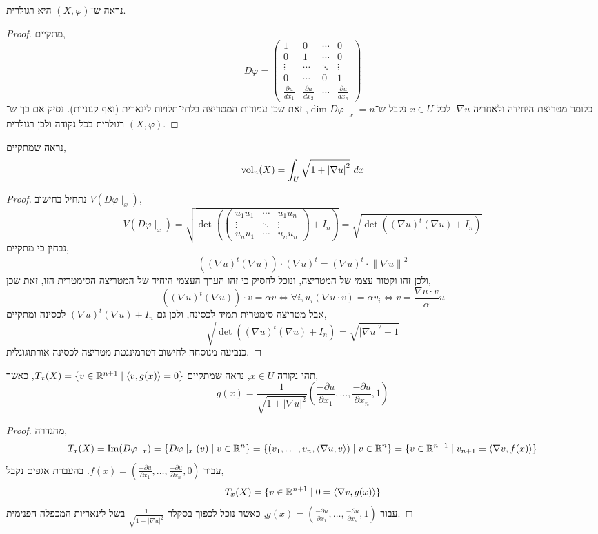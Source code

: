 \subquestion{}
נראה ש־$(X, \varphi)$ היא רגולרית.
\begin{proof}
	מתקיים,
	\[
		D\varphi
		= \begin{pmatrix}
			1 & 0 & \cdots & 0 \\
			0 & 1 & \cdots & 0 \\
			\vdots & \cdots & \ddots & \vdots \\
			0 & \cdots & 0 & 1 \\
			\frac{\partial u}{d x_1} & \frac{\partial u}{d x_2} & \cdots & \frac{\partial u}{d x_n}
		\end{pmatrix}
	\]
	כלומר מטריצת היחידה ולאחריה $\nabla u$.
	לכל $x \in U$ נקבל ש־$\dim D\varphi \mid_x = n$, זאת שכן עמודות המטריצה בלתי־תלויות לינארית (ואף קנוניות).
	נסיק אם כך ש־$(X, \varphi)$ רגולרית בכל נקודה ולכן רגולרית.
\end{proof}

\subquestion{}
נראה שמתקיים,
\[
	\operatorname{vol}_n(X)
	= \int_U \sqrt{1 + {|\nabla u|}^2}\ dx
\]
\begin{proof}
	נתחיל בחישוב $V(D\varphi \mid_x)$,
	\[
		V(D \varphi \mid_x)
		= \sqrt{\det\left(\begin{pmatrix}
				u_1 u_1 & \cdots & u_1 u_n \\
				\vdots & \ddots & \vdots \\
				u_n u_1 & \cdots & u_n u_n
		\end{pmatrix} + I_n\right)}
		= \sqrt{\det\left({(\nabla u)}^t (\nabla u) + I_n\right)}
	\]
	נבחין כי מתקיים,
	\[
		({(\nabla u)}^t (\nabla u)) \cdot {(\nabla u)}^t
		= {(\nabla u)}^t \cdot {\lVert \nabla u \rVert}^2
	\]
	ולכן זהו וקטור עצמי של המטריצה, ונוכל להסיק כי זהו הערך העצמי היחיד של המטריצה הסימטרית הזו, זאת שכן,
	\[
		({(\nabla u)}^t (\nabla u)) \cdot v = \alpha v
		\iff \forall i, 
		u_i (\nabla u \cdot v) = \alpha v_i
		\iff v = \frac{\nabla u \cdot v}{\alpha} u
	\]
	אבל מטריצה סימטרית תמיד לכסינה, ולכן גם ${(\nabla u)}^t (\nabla u) + I_n$ לכסינה ומתקיים,
	\[
		\sqrt{\det\left({(\nabla u)}^t (\nabla u) + I_n\right)}
		= \sqrt{{|\nabla u|}^2 + 1}
	\]
	כנביעה מנוסחה לחישוב דטרמיננטת מטריצה לכסינה אורתוגונלית.
\end{proof}

\subquestion{}
תהי נקודה $x \in U$, נראה שמתקיים $T_x(X) = \{v \in \mathbb{R}^{n + 1} \mid \langle v, g(x) \rangle = 0 \}$, כאשר,
\[
	g(x)
	= \frac{1}{\sqrt{1 + {|\nabla u|}^2}} \left( \frac{-\partial u}{\partial x_1}, \ldots, \frac{-\partial u}{\partial x_n}, 1 \right)
\]
\begin{proof}
	מהגדרה,
	\[
		T_x(X)
		= \operatorname{Im}(D \varphi \mid_x)
		= \{ D \varphi \mid_x(v) \mid v \in \mathbb{R}^n \}
		= \{ (v_1, \ldots, v_n, \langle \nabla u, v \rangle) \mid v \in \mathbb{R}^n \}
		= \{ v \in \mathbb{R}^{n + 1} \mid v_{n + 1} = \langle \nabla v, f(x) \rangle \}
	\]
	עבור $f(x) = \left( \frac{-\partial u}{\partial x_1}, \ldots, \frac{-\partial u}{\partial x_n}, 0 \right)$.
	בהעברת אגפים נקבל,
	\[
		T_x(X)
		= \{ v \in \mathbb{R}^{n + 1} \mid 0 = \langle \nabla v, g(x) \rangle \}
	\]
	עבור $g(x) = \left( \frac{-\partial u}{\partial x_1}, \ldots, \frac{-\partial u}{\partial x_n}, 1 \right)$, כאשר נוכל לכפוך בסקלר $\frac{1}{\sqrt{1 + {|\nabla u|}^2}}$ בשל לינאריות המכפלה הפנימית.
\end{proof}

